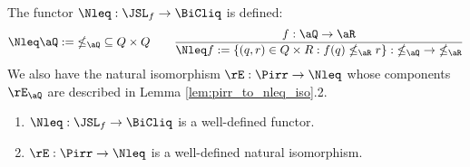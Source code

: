 \documentclass{article}
\begin{document}
\begin{definition}
\label{def:nleq_functor_nat_iso}
\item
The functor $\Nleq : \JSL_f \to \BiCliq$ is defined:
\[
\Nleq \aQ := \; \nleq_\aQ \; \subseteq Q \times Q
\qquad
\dfrac{f : \aQ \to \aR}
{\Nleq f := \{ (q,r) \in Q \times R : f(q) \nleq_\aR r \} : \; \nleq_\aQ \; \to \; \nleq_\aR }
\]
We also have the natural isomorphism $\rE : \Pirr \to \Nleq$ whose components $\rE_\aQ$  are described in Lemma \ref{lem:pirr_to_nleq_iso}.2. \endbox
\end{definition}



\begin{lemma}
\label{lem:nleq_e_well_def}
\item
\begin{enumerate}
\item
$\Nleq : \JSL_f \to \BiCliq$ is a well-defined functor.
\item
$\rE : \Pirr \to \Nleq$ is a well-defined natural isomorphism. 
\end{enumerate}
\end{lemma}
\end{document}
